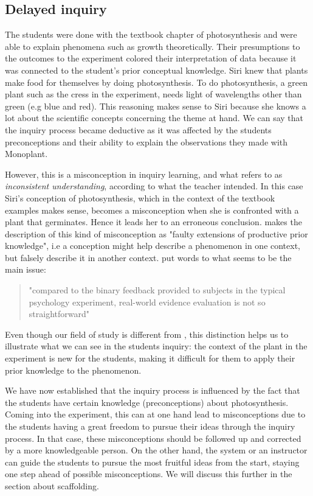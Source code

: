 \subsection{Delayed inquiry}
The students were done with the textbook chapter of photosynthesis and were able to explain  phenomena such as growth theoretically. Their presumptions to the outcomes to the experiment colored their interpretation of data because it was connected to the student's prior conceptual knowledge. Siri knew that plants make food for themselves by doing photosynthesis. To do photosynthesis, a green plant such as the cress in the experiment, needs light of wavelengths other than green (e.g blue and red). This reasoning makes sense to Siri because she knows a lot about the scientific concepts concerning the theme at hand. We can say that the inquiry process became deductive as it was affected by the students preconceptions and their ability to explain the observations they made with Monoplant. 

However, this is a misconception in inquiry learning, and what \citet{gomez2008elementary} refers to as \emph{inconsistent understanding}, according to what the teacher intended. In this case Siri's conception of photosynthesis, which in the context of the textbook examples makes sense, becomes a misconception when she is confronted with a plant that germinates. Hence it leads her to an erroneous conclusion. \citet{smith1994misconceptions} makes the description of this kind of misconception as "faulty extensions of productive prior knowledge", i.e a conception might help describe a phenomenon in one context, but falsely describe it in another context. \citeauthor*{klahr1993heuristics} put words to what seems to be the main issue: 

\begin{quote}"compared to the binary feedback provided to subjects in the typical psychology experiment, real-world evidence evaluation is not so straightforward" \citetext{\citet[p. 114]{klahr1993heuristics}, referenced in \citealp{de1998scientific}}
\end{quote}

Even though our field of study is different from \citeauthor{klahr1993heuristics}, this distinction helps us to illustrate what we can see in the students inquiry: the context of the plant in the experiment is new for the students, making it difficult for them to apply their prior knowledge to the phenomenon.  

We have now established that the inquiry process is influenced by the fact that the students have certain knowledge (preconceptions) about photosynthesis. Coming into the experiment, this can at one hand lead to misconceptions due to the students having a great freedom to pursue their ideas through the inquiry process. In that case, these misconceptions should be followed up and corrected by a more knowledgeable person. On the other hand, the system or an instructor can guide the students to pursue the most fruitful ideas from the start, staying one step ahead of possible misconceptions. We will discuss this further in the section about scaffolding.



